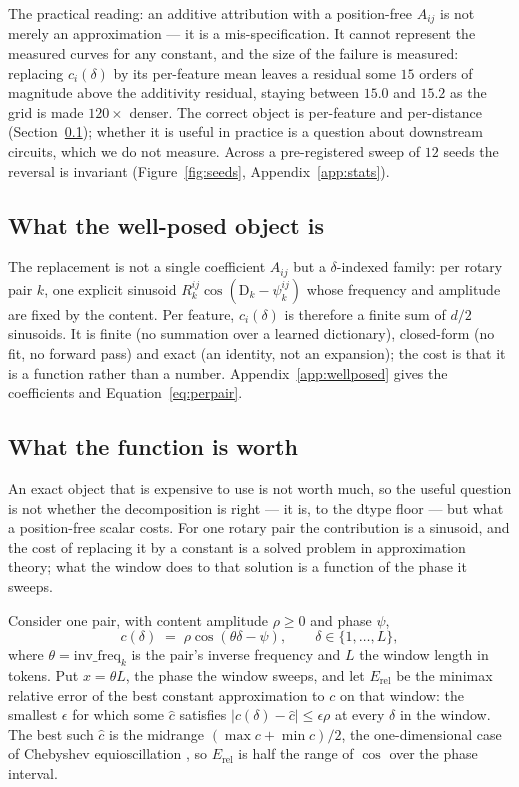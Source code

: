 \documentclass{article}
\theoremstyle{plain}
\theoremstyle{remark}
\newcommand{\invf}{\mathrm{inv\_freq}}
\newcommand{\D}{\mathrm{D}_k}
\newcommand{\psik}{\psi_k}
\newcommand{\half}{d/2}
\begin{document}
The practical reading: an additive attribution with a position-free $A_{ij}$ is
not merely an approximation --- it is a mis-specification. It cannot represent
the measured curves for any constant, and the size of the failure is measured:
replacing $c_i(\delta)$ by its per-feature mean leaves a residual some $15$
orders of magnitude above the additivity residual, staying between $15.0$ and
$15.2$ as the grid is made $120\times$ denser. The correct object is per-feature
and per-distance (Section~\ref{sec:wellposed}); whether it is useful in practice
is a question about downstream circuits, which we do not measure. Across a
pre-registered sweep of $12$ seeds the reversal is invariant
(Figure~\ref{fig:seeds}, Appendix~\ref{app:stats}).

\subsection{What the well-posed object is}
\label{sec:wellposed}
The replacement is not a single coefficient $A_{ij}$ but a $\delta$-indexed
family: per rotary pair $k$, one explicit sinusoid $R_k^{ij}\cos(\D-\psik^{ij})$
whose frequency and amplitude are fixed by the content. Per feature,
$c_i(\delta)$ is therefore a finite sum of $\half$ sinusoids. It is finite
(no summation over a learned dictionary), closed-form (no fit, no forward pass)
and exact (an identity, not an expansion); the cost is that it is a function
rather than a number. Appendix~\ref{app:wellposed} gives the coefficients and
Equation~\ref{eq:perpair}.

\subsection{What the function is worth}
\label{sec:worth}

An exact object that is expensive to use is not worth much, so the useful
question is not whether the decomposition is right --- it is, to the dtype floor
--- but what a position-free scalar costs. For one
rotary pair the contribution is a sinusoid, and the cost of replacing it by a
constant is a solved problem in approximation theory; what the window does to
that solution is a function of the phase it sweeps.

Consider one pair, with content amplitude $\rho\ge0$ and phase $\psi$,
\begin{equation}
  c(\delta) \;=\; \rho\cos(\theta\delta-\psi),
  \qquad \delta \in \{1,\dots,L\},
  \label{eq:pairprofile}
\end{equation}
where $\theta=\invf_k$ is the pair's inverse frequency and $L$ the window length
in tokens. Put $x=\theta L$, the phase the window sweeps, and let
$E_{\mathrm{rel}}$ be the minimax relative error of the best constant
approximation to $c$ on that window: the smallest $\epsilon$ for which some
$\hat c$ satisfies $|c(\delta)-\hat c|\le\epsilon\rho$ at every $\delta$ in the
window. The best such $\hat c$ is the midrange $(\max c+\min c)/2$, the
one-dimensional case of Chebyshev equioscillation
\citep{powell1981approximation}, so $E_{\mathrm{rel}}$ is half the range of
$\cos$ over the phase interval.
\end{document}
